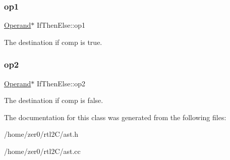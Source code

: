 \subsubsection{\texorpdfstring{op1}{op1}}
{\footnotesize\ttfamily \hyperlink{class_operand}{Operand}$\ast$ If\+Then\+Else\+::op1\hspace{0.3cm}{\ttfamily [protected]}}

The destination if comp is true. \mbox{\label{class_if_then_else_a8c9663fc824f5b748bac322d01c3da84}} 
\subsubsection{\texorpdfstring{op2}{op2}}
{\footnotesize\ttfamily \hyperlink{class_operand}{Operand}$\ast$ If\+Then\+Else\+::op2\hspace{0.3cm}{\ttfamily [protected]}}

The destination if comp is false. 

The documentation for this class was generated from the following files\+:\begin{DoxyCompactItemize}
\item 
/home/zer0/rtl2\+C/ast.\+h\item 
/home/zer0/rtl2\+C/ast.\+cc\end{DoxyCompactItemize}
